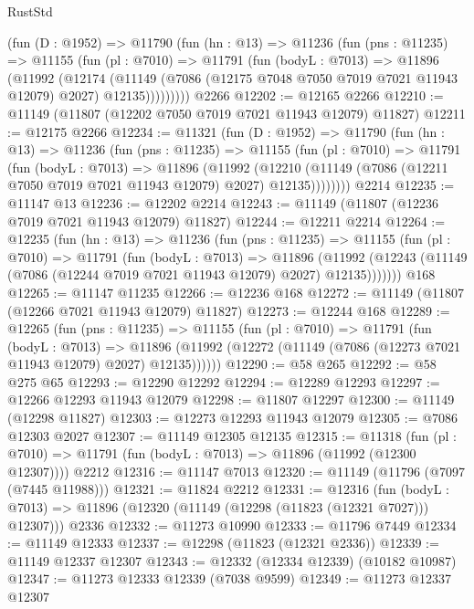 \begin{lexlean}{RustStd}
\begin{coremodule}
      (fun (D : @1952) =>
      @11790
        (fun (hn : @13) =>
        @11236
          (fun (pns : @11235) =>
          @11155
            (fun (pl : @7010) =>
            @11791
              (fun (bodyL : @7013) =>
              @11896
                (@11992
                  (@12174
                    (@11149
                      (@7086 (@12175 @7048 @7050 @7019 @7021 @11943 @12079) @2027)
                      @12135)))))))))
    @2266
@12202 := @12165 @2266
@12210 := @11149 (@11807 (@12202 @7050 @7019 @7021 @11943 @12079) @11827)
@12211 := @12175 @2266
@12234 := @11321
    (fun (D : @1952) =>
    @11790
      (fun (hn : @13) =>
      @11236
        (fun (pns : @11235) =>
        @11155
          (fun (pl : @7010) =>
          @11791
            (fun (bodyL : @7013) =>
            @11896
              (@11992
                (@12210
                  (@11149 (@7086 (@12211 @7050 @7019 @7021 @11943 @12079) @2027) @12135))))))))
    @2214
@12235 := @11147 @13
@12236 := @12202 @2214
@12243 := @11149 (@11807 (@12236 @7019 @7021 @11943 @12079) @11827)
@12244 := @12211 @2214
@12264 := @12235
    (fun (hn : @13) =>
    @11236
      (fun (pns : @11235) =>
      @11155
        (fun (pl : @7010) =>
        @11791
          (fun (bodyL : @7013) =>
          @11896
            (@11992 (@12243 (@11149 (@7086 (@12244 @7019 @7021 @11943 @12079) @2027) @12135)))))))
    @168
@12265 := @11147 @11235
@12266 := @12236 @168
@12272 := @11149 (@11807 (@12266 @7021 @11943 @12079) @11827)
@12273 := @12244 @168
@12289 := @12265
    (fun (pns : @11235) =>
    @11155
      (fun (pl : @7010) =>
      @11791
        (fun (bodyL : @7013) =>
        @11896 (@11992 (@12272 (@11149 (@7086 (@12273 @7021 @11943 @12079) @2027) @12135))))))
@12290 := @58 @265
@12292 := @58 @275 @65
@12293 := @12290 @12292
@12294 := @12289 @12293
@12297 := @12266 @12293 @11943 @12079
@12298 := @11807 @12297
@12300 := @11149 (@12298 @11827)
@12303 := @12273 @12293 @11943 @12079
@12305 := @7086 @12303 @2027
@12307 := @11149 @12305 @12135
@12315 := @11318
    (fun (pl : @7010) => @11791 (fun (bodyL : @7013) => @11896 (@11992 (@12300 @12307))))
    @2212
@12316 := @11147 @7013
@12320 := @11149 (@11796 (@7097 (@7445 @11988)))
@12321 := @11824 @2212
@12331 := @12316
    (fun (bodyL : @7013) => @11896 (@12320 (@11149 (@12298 (@11823 (@12321 @7027))) @12307)))
    @2336
@12332 := @11273 @10990
@12333 := @11796 @7449
@12334 := @11149 @12333
@12337 := @12298 (@11823 (@12321 @2336))
@12339 := @11149 @12337 @12307
@12343 := @12332 (@12334 @12339) (@10182 @10987)
@12347 := @11273 @12333 @12339 (@7038 @9599)
@12349 := @11273 @12337 @12307

\end{coremodule}
\end{lexlean}
